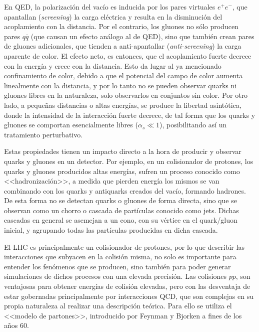En QED, la polarización del vacío es inducida por los
pares virtuales $e^{+}e^{-}$, que apantallan (\textit{screening}) la carga eléctrica y resulta en la disminución del
acoplamiento con la distancia. Por el contrario, los gluones no sólo producen pares $q\bar{q}$ (que causan un efecto análogo al de QED), sino que también crean pares de gluones adicionales,
que tienden a anti-apantallar (\textit{anti-screening}) la carga aparente de color. El efecto neto, es entonces, que el acoplamiento fuerte decrece con la energía y crece con la distancia. Esto da lugar al ya mencionado confinamiento de color, debido a que el potencial del campo de color aumenta linealmente con la distancia, y por lo tanto no se pueden observar quarks ni gluones libres en la naturaleza, solo observarlos en conjuntos sin color. Por otro lado, a pequeñas distancias o altas energías, se produce la libertad asintótica, donde la intensidad de
la interacción fuerte decrece, de tal forma que los quarks y gluones se comportan
esencialmente libres ($\alpha_s \ll 1$), posibilitando así un tratamiento perturbativo. 

Estas propiedades tienen un impacto directo a la hora de producir y observar quarks y gluones en un detector. Por ejemplo, en un colisionador de protones, los quarks y
gluones producidos altas energías, sufren un proceso conocido como <<hadronización>>,
a medida que pierden energía los mismos se van combinando con los quarks y antiquarks creados del vacío, formando hadrones. De esta forma no se detectan quarks o gluones de forma directa, sino que se observan como un chorro o cascada de partículas conocido como jets. Dichas cascadas en general se asemejan a un cono, con su vértice en el quark/gluon inicial, y agrupando todas las partículas producidas en dicha cascada. 




El LHC es principalmente un colisionador de protones, por lo que describir las interacciones que subyacen en la colisión misma, no solo es importante para entender los fenómenos que se producen, sino también para poder generar simulaciones de dichos procesos con una elevada precisión. Las colisiones $pp$, son ventajosas para obtener energías de colisión elevadas, pero con las desventaja de estar gobernadas principalmente por interacciones QCD, que son complejas en su propia naturaleza al realizar una descripción teórica. Para ello se utiliza el <<modelo de partones>>, introducido por Feynman \cite{feynman} y Bjorken \cite{bjorken} a fines de los años 60. 

